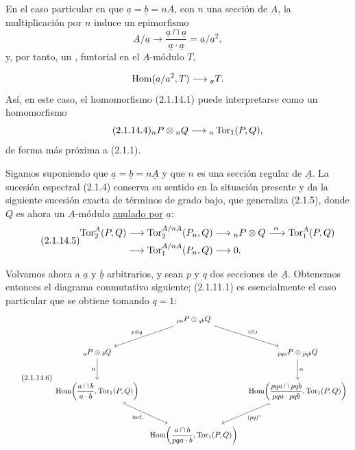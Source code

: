 En el caso particular en que
$\underline a=\underline b=n\underline A$, con $n$ una sección de
$\underline A$, la multiplicación por $n$ induce un epimorfismo
\[
 \underline A/\underline a
 \longrightarrow
 \frac{\underline a\cap\underline a}
      {\underline a\mathbin{\cdot}\underline a}
 =\underline a/\underline a^2,
\]
y, por tanto, un ,
funtorial en el $\underline A$-módulo $T$,


\[
 \operatorname{Hom}(a/a^2,T)
 \longrightarrow{}_{a}T.
\]
Así, en este caso, el homomorfismo (2.1.14.1) puede interpretarse como
un homomorfismo
\begin{equation}\tag{2.1.14.4}
 {}_nP\otimes{}_nQ
 \longrightarrow{}_n\operatorname{Tor}_1(P,Q),
\end{equation}
de forma más próxima a (2.1.1).

Sigamos suponiendo que $\underline a=\underline b=n\underline A$ y
que $n$ es una sección regular de $\underline A$. La sucesión
espectral (2.1.4) conserva su sentido en la situación presente y da la
siguiente sucesión exacta de términos de grado bajo, que generaliza
(2.1.5), donde $Q$ es ahora un $\underline A$-módulo \underline{anulado por}
$\underline a$:
\begin{equation}\tag{2.1.14.5}
\begin{split}
 \operatorname{Tor}^{A}_2(P,Q)
 &\longrightarrow
 \operatorname{Tor}^{A/nA}_2(P_n,Q)
 \longrightarrow{}_nP\otimes Q
 \xrightarrow{\ \alpha\ }
 \operatorname{Tor}^{A}_1(P,Q)\\
 &\longrightarrow
 \operatorname{Tor}^{A/nA}_1(P_n,Q)
 \longrightarrow0.
\end{split}
\end{equation}

Volvamos ahora a $\underline a$ y $\underline b$ arbitrarios, y sean
$p$ y $q$ dos secciones de $\underline A$. Obtenemos entonces el
diagrama conmutativo siguiente; (2.1.11.1) es esencialmente el caso
particular que se obtiene tomando $q=1$:
{\footnotesize
\begin{equation}\tag{2.1.14.6}
\begin{tikzcd}[row sep=large,column sep=tiny]
 &{}_{p\underline a}P\otimes{}_{q\underline b}Q
   \arrow[dl,"p\otimes q"']
   \arrow[dr,"i\otimes j"]&\\
 {}_{\underline a}P\otimes{}_{\underline b}Q
   \arrow[d,"\alpha"']&&
 {}_{pq\underline a}P\otimes{}_{pq\underline b}Q
   \arrow[d,"\alpha"]\\
 \uHom\!\left(
   \dfrac{\underline a\cap\underline b}
         {\underline a\mathbin{\cdot}\underline b},
   \uTor_1(P,Q)
 \right)
   \arrow[dr,hook,"\mathrm{incl.}"']&&
 \uHom\!\left(
   \dfrac{pq\underline a\cap pq\underline b}
         {pq\underline a\mathbin{\cdot}pq\underline b},
   \uTor_1(P,Q)
 \right)
   \arrow[dl,hook,"(pq)^*"]\\
 &\uHom\!\left(
   \dfrac{\underline a\cap\underline b}
         {pq\underline a\mathbin{\cdot}\underline b},
   \uTor_1(P,Q)
 \right)&
\end{tikzcd}
\end{equation}}

